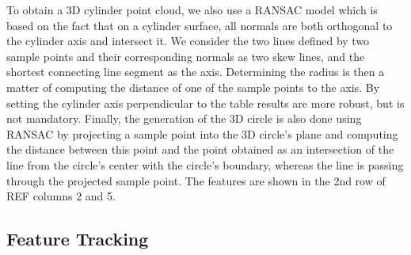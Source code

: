 To obtain a 3D cylinder point cloud, we also use a RANSAC model which is
based on the fact that on a cylinder surface, all normals are both orthogonal
to the cylinder axis and intersect it. We consider the two lines
defined by two sample points and their corresponding normals as two skew lines,
and the shortest connecting line segment as the axis.
Determining the radius is then a matter of computing the distance of one of the
sample points to the axis. By setting the cylinder axis perpendicular to the table results are more
robust, but is not mandatory. Finally, the generation of the 3D circle  is also
done using RANSAC by projecting a sample point into the 
3D circle's plane and computing the distance between this point and 
the point obtained as an intersection of the line from the circle's center with the 
circle's boundary, whereas the line is passing through the projected sample point.
The features are shown in the 2nd row of REF%
columns 2 and 5.
\subsection{Feature Tracking}

